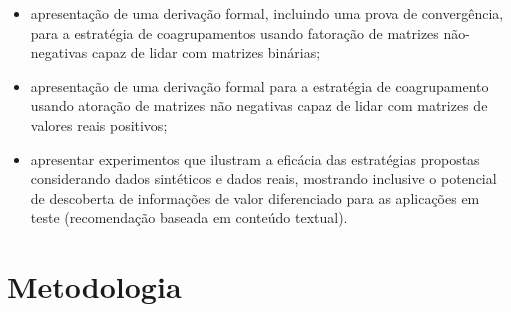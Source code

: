 \documentclass[
    12pt,                %
    oneside,            %
    a4paper,            %
    english,            %
    brazil                %
    ]{abntex2ppgsi}
\begin{document}
\begin{itemize}


\item apresentação de uma derivação formal, incluindo uma prova de convergência, para a estratégia de coagrupamentos usando fatoração de matrizes não-negativas capaz de lidar com matrizes binárias;

\item apresentação de uma derivação formal para a estratégia de coagrupamento usando atoração de matrizes não negativas capaz de lidar com matrizes de valores reais positivos;

\item apresentar experimentos que ilustram a eficácia das estratégias propostas considerando dados sintéticos e dados reais, mostrando inclusive o potencial de descoberta de informações de valor diferenciado para as aplicações em teste (recomendação baseada em conteúdo textual).


\end{itemize}


\section{Metodologia}
\end{document}
